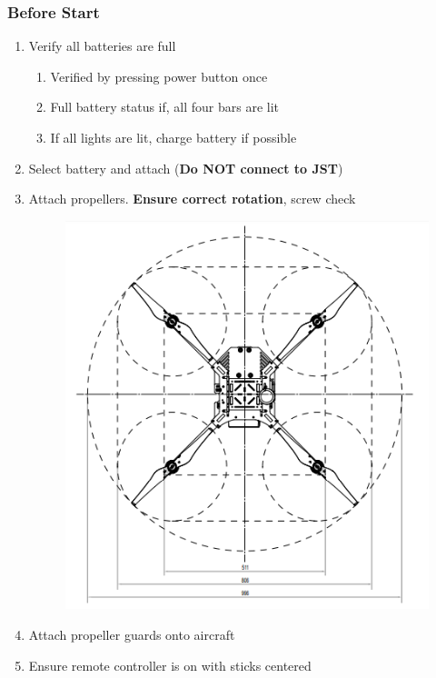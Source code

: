 \subsubsection{Before Start}
\begin{enumerate}
\setlength{\itemsep}{0em}
\setlength{\parskip}{0em}
\item Verify all batteries are full
\begin{enumerate}
\setlength{\itemsep}{0em}
\setlength{\parskip}{0em}
\item Verified by pressing power button once
\item Full battery status if, all four bars are lit 
\item If all lights are lit, charge battery if possible
\end{enumerate}
\item Select battery and attach (\textbf{Do NOT connect to JST})
\item Attach propellers. \textbf{Ensure correct rotation}, screw check
\begin{figure}[h]
\begin{center}
\includegraphics[width=0.4\columnwidth]{figures/op1.png}
\end{center}
\end{figure}  
\item Attach propeller guards onto aircraft
\item Ensure remote controller is on with sticks centered
\end{enumerate}

